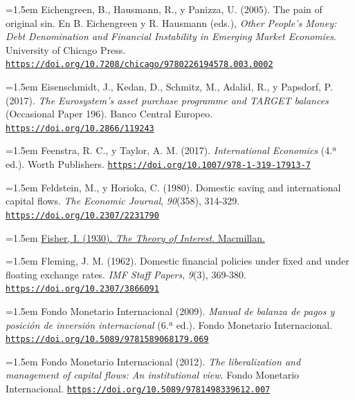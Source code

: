 \documentclass[10pt,a4paper]{article}
\begin{document}
\noindent\hangindent=1.5em Eichengreen, B., Hausmann, R., y Panizza, U. (2005). The pain of original sin. En B. Eichengreen y R. Hausmann (eds.), \textit{Other People's Money: Debt Denomination and Financial Instability in Emerging Market Economies}. University of Chicago Press. \href{https://doi.org/10.7208/chicago/9780226194578.003.0002}{\nolinkurl{https://doi.org/10.7208/chicago/9780226194578.003.0002}}

\noindent\hangindent=1.5em Eisenschmidt, J., Kedan, D., Schmitz, M., Adalid, R., y Papsdorf, P. (2017). \textit{The Eurosystem's asset purchase programme and TARGET balances} (Occasional Paper 196). Banco Central Europeo. \href{https://doi.org/10.2866/119243}{\nolinkurl{https://doi.org/10.2866/119243}}

\noindent\hangindent=1.5em Feenstra, R. C., y Taylor, A. M. (2017). \textit{International Economics} (4.ª ed.). Worth Publishers. \href{https://doi.org/10.1007/978-1-319-17913-7}{\nolinkurl{https://doi.org/10.1007/978-1-319-17913-7}}

\noindent\hangindent=1.5em Feldstein, M., y Horioka, C. (1980). Domestic saving and international capital flows. \textit{The Economic Journal}, \textit{90}(358), 314-329. \href{https://doi.org/10.2307/2231790}{\nolinkurl{https://doi.org/10.2307/2231790}}

\noindent\hangindent=1.5em \href{https://oll.libertyfund.org/titles/fisher-the-theory-of-interest}{Fisher, I. (1930). \textit{The Theory of Interest}. Macmillan.}

\noindent\hangindent=1.5em Fleming, J. M. (1962). Domestic financial policies under fixed and under floating exchange rates. \textit{IMF Staff Papers}, \textit{9}(3), 369-380. \href{https://doi.org/10.2307/3866091}{\nolinkurl{https://doi.org/10.2307/3866091}}

\noindent\hangindent=1.5em Fondo Monetario Internacional (2009). \textit{Manual de balanza de pagos y posición de inversión internacional} (6.ª ed.). Fondo Monetario Internacional. \href{https://doi.org/10.5089/9781589068179.069}{\nolinkurl{https://doi.org/10.5089/9781589068179.069}}

\noindent\hangindent=1.5em Fondo Monetario Internacional (2012). \textit{The liberalization and management of capital flows: An institutional view}. Fondo Monetario Internacional. \href{https://doi.org/10.5089/9781498339612.007}{\nolinkurl{https://doi.org/10.5089/9781498339612.007}}
\end{document}
